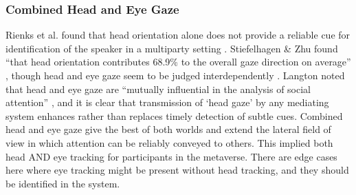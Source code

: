 \subsubsection{Combined Head and Eye Gaze}
Rienks et al. found that head orientation alone does not provide a reliable cue for identification of the speaker in a multiparty setting \cite{Rienks2010}. Stiefelhagen \& Zhu found ``that head orientation contributes 68.9\% to the overall gaze direction on average'' \cite{Stiefelhagen:2002:HOG:506443.506634}, though head and eye gaze seem to be judged interdependently \cite{Kluttz2009}. Langton noted that head and eye gaze are ``mutually influential in the analysis of social attention'' \cite{Langton2000a}, and it is clear that transmission of `head gaze' by any mediating system enhances rather than replaces timely detection of subtle cues. Combined head and eye gaze give the best of both worlds and extend the lateral field of view in which attention can be reliably conveyed to others. This implied both head AND eye tracking for participants in the metaverse. There are edge cases here where eye tracking might be present without head tracking, and they should be identified in the system.\\

